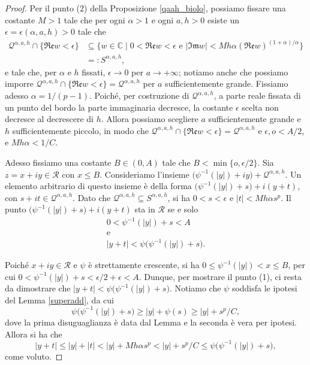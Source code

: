 \begin{proof}
    Per il punto (2) della Proposizione \ref{qaah_biolo}, possiamo fissare una costante $M>1$ tale che per ogni $\alpha>1$ e ogni $a,h>0$ esiste un $\epsilon=\epsilon(\alpha,a,h)>0$ tale che
    \begin{align*}
        \mathcal{Q}^{\alpha,a,h}\cap\{\mathfrak{Re}w<\epsilon\}&\subseteq \{w\in\mathbb{C}\mid 0<\mathfrak{Re}w<\epsilon\text{ e }|\mathfrak{Im}w|<Mh\alpha(\mathfrak{Re}w)^{(1+\alpha)/\alpha}\}\\
        &=:S^{\alpha,a,h},
    \end{align*}
    e tale che, per $\alpha$ e $h$ fissati, $\epsilon\longrightarrow0$ per $a\longrightarrow+\infty$; notiamo anche che possiamo imporre $\mathcal{Q}^{\alpha,a,h}\cap\{\mathfrak{Re}w<\epsilon\}=\mathcal{Q}^{\alpha,a,h}$ per $a$ sufficientemente grande. Fissiamo adesso $\alpha=1/(p-1)$. Poiché, per costruzione di $\mathcal{Q}^{\alpha,a,h}$, a parte reale fissata di un punto del bordo la parte immaginaria decresce, la costante $\epsilon$ scelta non decresce al decrescere di $h$. Allora possiamo scegliere $a$ sufficientemente grande e $h$ sufficientemente piccolo, in modo che $\mathcal{Q}^{\alpha,a,h}\cap\{\mathfrak{Re}w<\epsilon\}=\mathcal{Q}^{\alpha,a,h}$ e $\epsilon,o<A/2$, e $Mh\alpha<1/C$.
    
    Adesso fissiamo una costante $B\in(0,A)$ tale che $B<\min\{o,\epsilon/2\}$. Sia $z=x+iy\in\mathcal{R}$ con $x\le B$. Consideriamo l'insieme $\bigl(\psi^{-1}(|y|)+iy\bigr)+\mathcal{Q}^{\alpha,a,h}$. Un elemento arbitrario di questo insieme è della forma $\bigl(\psi^{-1}(|y|)+s\bigr)+i(y+t)$, con $s+it\in\mathcal{Q}^{\alpha,a,h}$. Dato che $\mathcal{Q}^{\alpha,a,h}\subseteq S^{\alpha,a,h}$, si ha $0<s<\epsilon$ e $|t|<Mh\alpha s^p$. Il punto $\bigl(\psi^{-1}(|y|)+s\bigr)+i(y+t)$ sta in $\mathcal{R}$ se e solo \begin{gather*}
        0<\psi^{-1}(|y|)+s<A\\
        \text{e}\\
        |y+t|<\psi\big(\psi^{-1}(|y|)+s\big).
    \end{gather*}

    Poiché $x+iy\in\mathcal{R}$ e $\psi$ è strettamente crescente, si ha $0 \le \psi^{-1}(|y|)<x\le B$, per cui $0<\psi^{-1}(|y|)+s<\epsilon/2+\epsilon<A$. Dunque, per mostrare il punto (1), ci resta da dimostrare che $|y+t|<\psi\big(\psi^{-1}(|y|)+s\big)$. Notiamo che $\psi$ soddisfa le ipotesi del Lemma \ref{superadd}, da cui
    $$\psi\big(\psi^{-1}(|y|)+s\big)\ge |y|+\psi(s)\ge |y|+s^p/C,$$
    dove la prima disuguaglianza è data dal Lemma e la seconda è vera per ipotesi. Allora si ha che
    $$|y+t| \le |y|+|t|<|y|+Mh\alpha s^p<|y|+s^p/C \le \psi\big(\psi^{-1}(|y|)+s\big),$$
    come voluto.


\end{proof}
